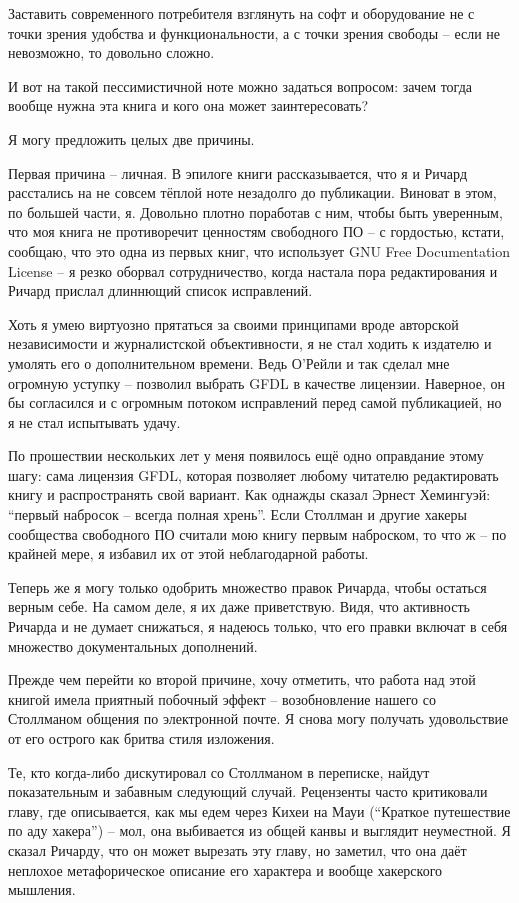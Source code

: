 Заставить современного потребителя взглянуть на софт и оборудование
не с точки зрения удобства и функциональности, а с точки зрения свободы
-- если не невозможно, то довольно сложно.

И вот на такой пессимистичной ноте можно задаться вопросом: зачем
тогда вообще нужна эта книга и кого она может заинтересовать?

Я могу предложить целых две причины.

Первая причина -- личная. В эпилоге книги рассказывается, что я и
Ричард расстались на не совсем тёплой ноте незадолго до публикации.
Виноват в этом, по большей части, я. Довольно плотно поработав с ним,
чтобы быть уверенным, что моя книга не противоречит ценностям
свободного ПО -- с гордостью, кстати, сообщаю, что это одна из первых
книг, что использует GNU Free Documentation License -- я резко оборвал
сотрудничество, когда настала пора редактирования и Ричард прислал
длиннющий список исправлений.

Хоть я умею виртуозно прятаться за своими принципами вроде
авторской независимости и журналистской объективности, я не стал
ходить к издателю и умолять его о дополнительном времени. Ведь
О'Рейли и так сделал мне огромную уступку -- позволил выбрать GFDL
в качестве лицензии. Наверное, он бы согласился и с огромным потоком
исправлений перед самой публикацией, но я не стал испытывать удачу.

По прошествии нескольких лет у меня появилось ещё одно оправдание
этому шагу: сама лицензия GFDL, которая позволяет любому читателю
редактировать книгу и распространять свой вариант. Как однажды
сказал Эрнест Хемингуэй: \enquote{первый набросок -- всегда полная хрень}.
Если Столлман и другие хакеры сообщества свободного ПО считали
мою книгу первым наброском, то что ж -- по крайней мере, я избавил
их от этой неблагодарной работы.

Теперь же я могу только одобрить множество правок Ричарда, чтобы
остаться верным себе. На самом деле, я их даже приветствую. Видя, что
активность Ричарда и не думает снижаться, я надеюсь только, что его
правки включат в себя множество документальных дополнений.

Прежде чем перейти ко второй причине, хочу отметить, что работа над
этой книгой имела приятный побочный эффект -- возобновление нашего
со Столлманом общения по электронной почте. Я снова могу получать
удовольствие от его острого как бритва стиля изложения.

Те, кто когда-либо дискутировал со Столлманом в переписке, найдут
показательным и забавным следующий случай. Рецензенты часто критиковали
главу, где описывается, как мы едем через Кихеи на Мауи (\enquote{Краткое
путешествие по аду хакера}) -- мол, она выбивается из общей канвы
и выглядит неуместной. Я сказал Ричарду, что он может вырезать эту
главу, но заметил, что она даёт неплохое метафорическое описание
его характера и вообще хакерского мышления.

